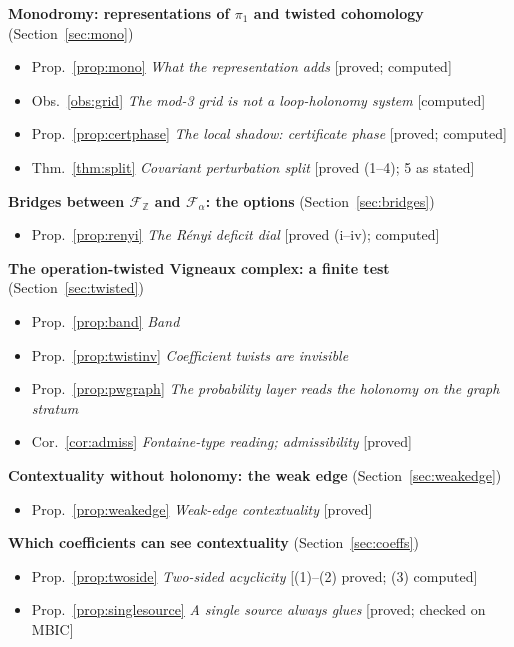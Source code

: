 \documentclass[11pt]{article}
\theoremstyle{definition}
\theoremstyle{remark}
\newcommand{\Z}{\mathbb{Z}}
\begin{document}
\noindent\textbf{Monodromy: representations of $\pi_1$ and twisted cohomology} (Section~\ref{sec:mono})
\begin{itemize}[itemsep=0pt]
  \item Prop.~\ref{prop:mono} \emph{What the representation adds} [proved; computed]
  \item Obs.~\ref{obs:grid} \emph{The mod-3 grid is not a loop-holonomy system} [computed]
  \item Prop.~\ref{prop:certphase} \emph{The local shadow: certificate phase} [proved; computed]
  \item Thm.~\ref{thm:split} \emph{Covariant perturbation split} [proved (1--4); 5 as stated]
\end{itemize}
\noindent\textbf{Bridges between $\mathcal F_{\Z}$ and $\mathcal F_\alpha$: the options} (Section~\ref{sec:bridges})
\begin{itemize}[itemsep=0pt]
  \item Prop.~\ref{prop:renyi} \emph{The R\'enyi deficit dial} [proved (i--iv); computed]
\end{itemize}
\noindent\textbf{The operation-twisted Vigneaux complex: a finite test} (Section~\ref{sec:twisted})
\begin{itemize}[itemsep=0pt]
  \item Prop.~\ref{prop:band} \emph{Band}
  \item Prop.~\ref{prop:twistinv} \emph{Coefficient twists are invisible}
  \item Prop.~\ref{prop:pwgraph} \emph{The probability layer reads the holonomy on the graph stratum}
  \item Cor.~\ref{cor:admiss} \emph{Fontaine-type reading; admissibility} [proved]
\end{itemize}
\noindent\textbf{Contextuality without holonomy: the weak edge} (Section~\ref{sec:weakedge})
\begin{itemize}[itemsep=0pt]
  \item Prop.~\ref{prop:weakedge} \emph{Weak-edge contextuality} [proved]
\end{itemize}
\noindent\textbf{Which coefficients can see contextuality} (Section~\ref{sec:coeffs})
\begin{itemize}[itemsep=0pt]
  \item Prop.~\ref{prop:twoside} \emph{Two-sided acyclicity} [(1)--(2) proved; (3) computed]
  \item Prop.~\ref{prop:singlesource} \emph{A single source always glues} [proved; checked on MBIC]
\end{itemize}
\end{document}

